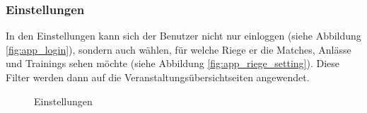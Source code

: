 \FloatBarrier
\subsubsection{Einstellungen}
In den Einstellungen kann sich der Benutzer nicht nur einloggen (siehe Abbildung \ref{fig:app_login}), sondern auch wählen, für welche Riege er die Matches, Anlässe und Trainings sehen möchte (siehe Abbildung \ref{fig:app_riege_setting}). Diese Filter werden dann auf die Veranstaltungsübersichtseiten angewendet.
\begin{figure}[ht]
\centering
{}
\label{fig:app_settings}
\caption{Einstellungen}
\end{figure}

